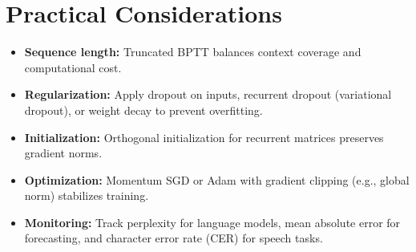 ﻿\documentclass[12pt]{article}
\begin{document}
\section{Practical Considerations}
\begin{itemize}
  \item \textbf{Sequence length:} Truncated BPTT balances context coverage and computational cost.\item \textbf{Regularization:} Apply dropout on inputs, recurrent dropout (variational dropout), or weight decay to prevent overfitting.\item \textbf{Initialization:} Orthogonal initialization for recurrent matrices preserves gradient norms.\item \textbf{Optimization:} Momentum SGD or Adam with gradient clipping (e.g., global norm) stabilizes training.\item \textbf{Monitoring:} Track perplexity for language models, mean absolute error for forecasting, and character error rate (CER) for speech tasks.\end{itemize}
\end{document}
